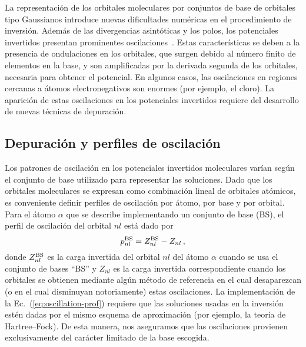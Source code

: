 La representación de los orbitales moleculares por conjuntos de base de 
orbitales tipo Gaussianos introduce nuevas dificultades numéricas en el 
procedimiento de inversión. Además de las divergencias asintóticas y los 
polos, los potenciales invertidos presentan prominentes 
oscilaciones~\cite{Schipper:97,Jacob:11,Gaiduk:13}. Estas 
características se deben a la presencia de ondulaciones en los 
orbitales, que surgen debido al número finito de elementos en la base, y 
son amplificadas por la derivada segunda de los orbitales, necesaria 
para obtener el potencial. En algunos casos, las oscilaciones en 
regiones cercanas a átomos electronegativos son enormes (por ejemplo, 
el cloro). La aparición de estas oscilaciones en los potenciales 
invertidos requiere del desarrollo de nuevas técnicas de depuración.

\subsection{Depuración y perfiles de oscilación}
\label{sec:invmol}

Los patrones de oscilación en los potenciales invertidos moleculares 
varían según el conjunto de base utilizado para representar las 
soluciones. Dado que los orbitales moleculares se expresan como 
combinación lineal de orbitales atómicos, es conveniente definir 
perfiles de oscilación por átomo, por base y por orbital. Para el átomo 
$\alpha$ que se describe implementando un conjunto de base (BS), el 
perfil de oscilación del orbital $nl$ está dado por
\begin{equation}
 p_{nl}^{\mbox{\scriptsize BS}} = Z_{nl}^{\mbox{\scriptsize BS}}-
 Z_{nl} \,,
 \label{eq:oscillation-prof}
\end{equation}
donde $Z_{nl}^{\mbox{\scriptsize BS}}$ es la carga invertida del orbital
$nl$ del átomo $\alpha$ cuando se usa el conjunto de bases ``BS'' y 
$Z_{nl}$ es la carga invertida correspondiente cuando los orbitales se 
obtienen mediante algún método de referencia en el cual desaparezcan 
(o en el cual disminuyan notoriamente) estas oscilaciones. La 
implementación de la Ec.~(\ref{eq:oscillation-prof}) requiere que las 
soluciones usadas en la inversión estén dadas por el mismo esquema de 
aproximación (por ejemplo, la teoría de Hartree--Fock). De esta manera, 
nos aseguramos que las oscilaciones provienen exclusivamente del 
carácter limitado de la base escogida.


